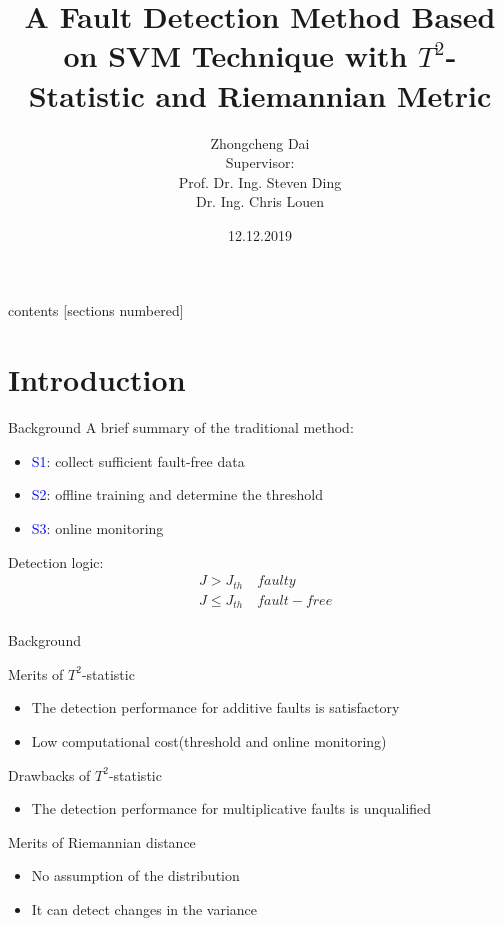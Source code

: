\documentclass[10pt]{beamer}
\title{A Fault Detection Method Based on SVM Technique with $T^2$-Statistic and Riemannian Metric}
\author{Zhongcheng Dai  \\
 Supervisor: \\
 Prof. Dr. Ing. Steven Ding\\
Dr. Ing. Chris Louen 
}
\date{12.12.2019}
\institute{Automatic Control and Complex Systems}
\begin{document}
\maketitle
\begin{frame}{contents}
  [sections numbered]
  \tableofcontents[hideallsubsections]
\end{frame}
\section{Introduction}
\begin{frame}{Background}
 A brief summary of the traditional method:
      \begin{itemize}
      \item \textcolor{blue}{S1}: collect sufficient fault-free data
      \item \textcolor{blue}{S2}: offline training and determine the threshold
      \item \textcolor{blue}{S3}: online monitoring  %
 	 \end{itemize}  
 Detection logic:
 \begin{equation}\nonumber
 \begin{aligned}
     &J > J_{th} \quad faulty \\
     &J \leq J_{th} \quad fault-free \\
     \end{aligned}
 \end{equation}
\end{frame}
\begin{frame}{Background}
 \begin{exampleblock}{Merits of $T^2$-statistic}
	\begin{itemize}
    \item The detection performance for additive faults is satisfactory
    \item Low computational cost(threshold and online monitoring)
    \end{itemize}
    \end{exampleblock}
    \begin{exampleblock}{Drawbacks of $T^2$-statistic}
      \begin{itemize}
      \item The detection performance for multiplicative faults is unqualified
 	 \end{itemize}  
 	 \end{exampleblock}
 	   \begin{exampleblock}{Merits of Riemannian distance}
      \begin{itemize}
      \item No assumption of the distribution
      \item It can detect changes in the variance
 	 \end{itemize}  
 	 \end{exampleblock}
\end{frame}
\end{document}
